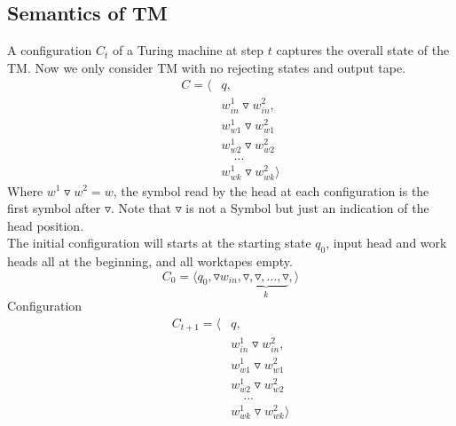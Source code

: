 \documentclass{article}
\newtheorem{definition}[theorem]{Definition}
\let\olddefinition\definition
\let\endolddefinition\enddefinition
\renewenvironment{definition}
  {\begin{tcolorbox}[
      colback=red!10,
      colframe=red!50!black,
      boxrule=0.6pt,
      arc=2pt,
      left=6pt,right=6pt,top=4pt,bottom=4pt,
      breakable
    ]\olddefinition}
  {\endolddefinition\end{tcolorbox}}
\begin{document}
\subsection{Semantics of TM}
\begin{definition}[Configuration]
    A configuration $C_t$ of a Turing machine at step $t$ captures the overall state of the TM. Now we only consider TM with no rejecting states and output tape.
    \begin{align*}
        C = \langle &q,\\
        & w_{in}^1\triangledown w_{in}^2, \\
        & w_{w1}^1\triangledown w_{w1}^2 \\
        & w_{w2}^1\triangledown w_{w2}^2 \\
        &\quad ...\\
        & w_{wk}^1\triangledown w_{wk}^2 \rangle
    \end{align*}
    Where $w^1 \triangledown w^2 = w$, the symbol read by the head at each configuration is the first symbol after $\triangledown$. Note that $\triangledown$ is not a 
    Symbol but just an indication of the head position.\\
    The initial configuration will starts at the starting state $q_0$, input head and work heads all at the beginning, and all worktapes empty.
    \[
        C_0 = \langle 
        q_0, \triangledown w_{in}, 
        \underbrace{\triangledown, \triangledown, \dots, \triangledown}_{k},
        \rangle
    \]
    Configuration 
    \begin{align*}
        C_{t+ 1} = \langle &q,\\
        & w_{in}^1\triangledown w_{in}^2, \\
        & w_{w1}^1\triangledown w_{w1}^2 \\
        & w_{w2}^1\triangledown w_{w2}^2 \\
        &\quad ...\\
        & w_{wk}^1\triangledown w_{wk}^2 \rangle
    \end{align*}


\end{definition}
\end{document}
